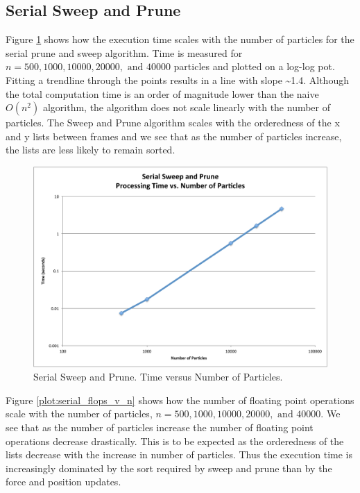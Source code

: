 \documentclass[11pt]{article} %
\begin{document}
\subsection{Serial Sweep and Prune}

Figure \ref{plot:serial_t_v_n} shows how the execution time scales
with the number of particles for the serial prune and sweep algorithm.
Time is measured for $n=500,1000,10000,20000,\text{ and }40000$ particles
and plotted on a log-log pot. Fitting a trendline through the points
results in a line with slope \textasciitilde{}1.4. Although the total
computation time is an order of magnitude lower than the naive $O(n^{2})$
algorithm, the algorithm does not scale linearly with the number of
particles. The Sweep and Prune algorithm scales with the orderedness
of the x and y lists between frames and we see that as the number
of particles increase, the lists are less likely to remain sorted. 

\begin{figure}
\begin{centering}
\includegraphics[width=0.5\paperwidth]{figures/serial_t_v_n}
\par\end{centering}

\caption{Serial Sweep and Prune. Time versus Number of Particles.}
\label{plot:serial_t_v_n}

\end{figure}


Figure \ref{plot:serial_flops_v_n} shows how the number of floating
point operations scale with the number of particles, $n=500,1000,10000,20000,\text{ and }40000$.
We see that as the number of particles increase the number of floating
point operations decrease drastically. This is to be expected as the
orderedness of the lists decrease with the increase in number of particles.
Thus the execution time is increasingly dominated by the sort required
by sweep and prune than by the force and position updates.
\end{document}
